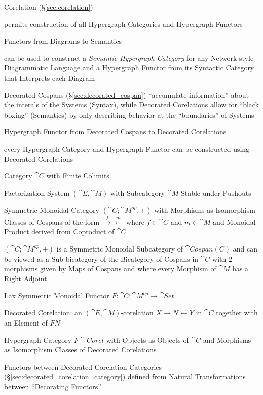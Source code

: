 Corelation (\S\ref{sec:corelation})

permits construction of all Hypergraph Categories and Hypergraph
Functors

Functors from Diagrams to Semantics

can be used to construct a \emph{Semantic Hypergraph Category} for any
Network-style Diagrammatic Language and a Hypergraph Functor from its
Syntactic Category that Interprets each Diagram

Decorated Cospans (\S\ref{sec:decorated_cospan}) ``accumulate
information'' about the interals of the Systems (Syntax), while
Decorated Corelations allow for ``black boxing'' (Semantics) by only
describing behavior at the ``boundaries'' of Systems

Hypergraph Functor from Decorated Cospans to Decorated Corelations

every Hypergraph Category and Hypergraph Functor can be constructed
using Decorated Corelations

Category $\cat{C}$ with Finite Colimits

Factorization System $(\cat{E},\cat{M})$ with Subcategory $\cat{M}$
Stable under Pushouts

Symmetric Monoidal Category $(\cat{C};\cat{M}^{op}, +)$ with Morphisms
as Isomorphism Classes of Cospans of the form
$\xrightarrow{f}\xleftarrow{m}$ where $f \in \cat{C}$ and $m \in
\cat{M}$ and Monoidal Product derived from Coproduct of $\cat{C}$

$(\cat{C};\cat{M}^{op}, +)$ is a Symmetric Monoidal Subcategory of
$\cat{Cospan(C)}$ and can be viewed as a Sub-bicategory of the
Bicategory of Cospans in $\cat{C}$ with $2$-morphisms given by Maps of
Cospans and where every Morphism of $\cat{M}$ has a Right Adjoint

Lax Symmetric Monoidal Functor $F : \cat{C};\cat{M}^{op} \rightarrow
\cat{Set}$

Decorated Corelation: an $(\cat{E},\cat{M})$-corelation $X \rightarrow
N \leftarrow Y$ in $\cat{C}$ together with an Element of $F N$ %

Hypergraph Category $F\cat{Corel}$ with Objects as Objects of
$\cat{C}$ and Morphisms as Isomorphism Classes of Decorated
Corelations

Functors between Decorated Corelation Categories
(\S\ref{sec:decorated_corelation_category}) defined from Natural
Transformations between ``Decorating Functors'' %



